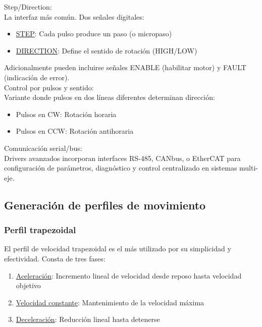 Step/Direction:\\
\noindent
La interfaz más común. Dos señales digitales:
\begin{itemize}[label=$\bullet$]
    \item \underline{STEP}: Cada pulso produce un paso (o micropaso)
    \item \underline{DIRECTION}: Define el sentido de rotación (HIGH/LOW)
\end{itemize}

Adicionalmente pueden incluirse señales ENABLE (habilitar motor) y FAULT (indicación de error).\\

Control por pulsos y sentido:\\
\noindent
Variante donde pulsos en dos líneas diferentes determinan dirección:
\begin{itemize}[label=$\bullet$]
    \item Pulsos en CW: Rotación horaria
    \item Pulsos en CCW: Rotación antihoraria
\end{itemize}

Comunicación serial/bus:\\
\noindent
Drivers avanzados incorporan interfaces RS-485, CANbus, o EtherCAT para configuración de parámetros, diagnóstico y control centralizado en sistemas multi-eje.

\subsection{Generación de perfiles de movimiento}

\subsubsection{Perfil trapezoidal}

El perfil de velocidad trapezoidal es el más utilizado por su simplicidad y efectividad. Consta de tres fases:

\begin{enumerate}[label=$\bullet$]
    \item \underline{Aceleración}: Incremento lineal de velocidad desde reposo hasta velocidad objetivo
    \item \underline{Velocidad constante}: Mantenimiento de la velocidad máxima
    \item \underline{Deceleración}: Reducción lineal hasta detenerse
\end{enumerate}

